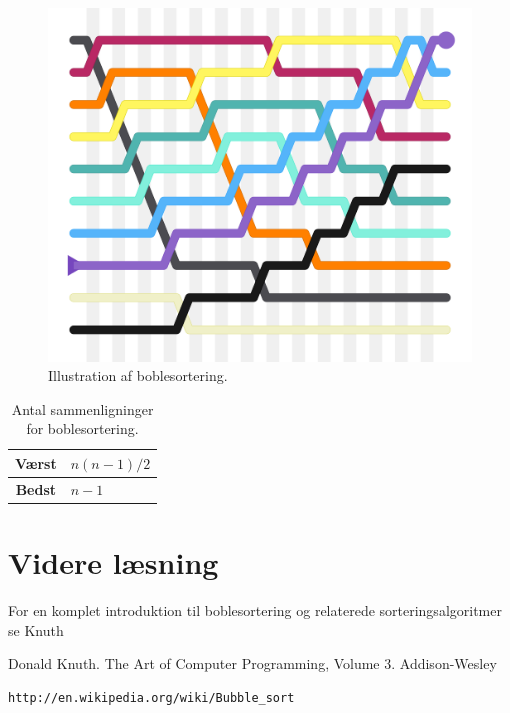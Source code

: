\documentclass[a4paper]{article}
\begin{document}
\begin{figure}
	\centering
	\includegraphics[width=0.4\linewidth]{Bubblesort.png}
	\caption{Illustration af boblesortering.}
	\label{fig:bubblesort}
\end{figure}

\begin{table}[h!]
	\begin{center}
		\begin{tabular}{|c|l|} %
			\hline
			\textbf{Værst} & \(n(n - 1)/2\)\\
			\hline
			\textbf{Bedst} & \(n-1\) \\
			\hline
		\end{tabular}
	\end{center}
	\caption{Antal sammenligninger for boblesortering.}
	\label{tab:boblesammenligninger}
\end{table}

\section{Videre læsning}
For en komplet introduktion til boblesortering og relaterede sorteringsalgoritmer
se Knuth \cite{DonaldKnuthTAOCP}

\begin{thebibliography}{99}

  Donald Knuth.
  The Art of Computer Programming,
  Volume 3.
  Addison-Wesley

\begin{verbatim}
http://en.wikipedia.org/wiki/Bubble_sort
\end{verbatim}

\end{thebibliography}
\end{document}
